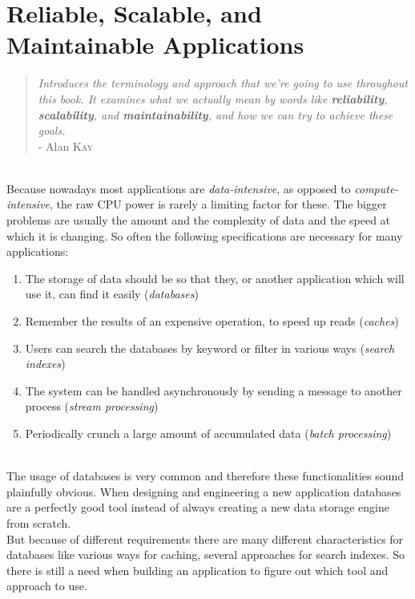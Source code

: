 \documentclass{article}
\begin{document}
	\pagestyle{fancy}
	\section{Reliable, Scalable, and Maintainable Applications}
	\begin{adjustwidth}{2em}{2em}
		\begin{quote}
			\textit{Introduces the terminology and approach that we're going to use throughout this book. It examines what we actually mean by words like \textbf{reliability}, \textbf{scalability}, and \textbf{maintainability}, and how we can try to achieve these goals.} \\
			- Alan \textsc{Kay}
		\end{quote}	
		\hfill \\
		Because nowadays most applications are \textit{data-intensive}, as opposed to \textit{compute-intensive}, the raw CPU power is rarely a limiting factor for these. The bigger problems are usually the amount and the complexity of data and the speed at which it is changing. So often the following specifications are necessary for many applications: \\
		\begin{adjustwidth}{1em}{1em}
			\begin{enumerate}[\footnotesize{\textbullet}]
				\item The storage of data should be so that they, or another application which will use it, can find it easily (\textit{databases})
				\item Remember the results of an expensive operation, to speed up reads (\textit{caches})
				\item Users can search the databases by keyword or filter in various ways (\textit{search indexes})
				\item The system can be handled asynchronously by sending a message to another process (\textit{stream processing})
				\item Periodically crunch a large amount of accumulated data (\textit{batch processing})
			\end{enumerate}
		\end{adjustwidth}
		\hfill \\
		The usage of databases is very common and therefore these functionalities sound plainfully obvious. When designing and engineering a new application databases are a perfectly good tool instead of always creating a new data storage engine from scratch. \\
		But because of different requirements there are many different characteristics for databases like various ways for caching, several approaches for search indexes. So there is still a need when building an application to figure out which tool and approach to use.

\end{adjustwidth}
\end{document}
